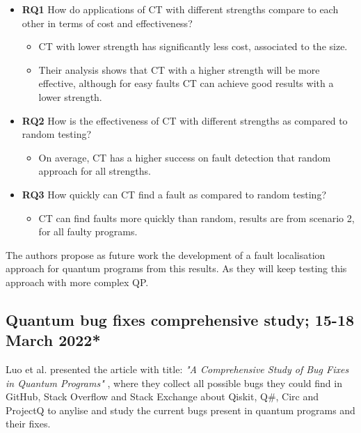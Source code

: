 \begin{itemize}
\begin{itemize}
    \item[] \textbf{RQ1} How do applications of CT with different strengths compare to each other in terms of cost and effectiveness?
        \begin{itemize}
            \item CT with lower strength has significantly less cost, associated to the size.
            \item Their analysis shows that CT with a higher strength will be more effective, although for easy faults CT can achieve good results with a lower strength.
        \end{itemize}
    \item[] \textbf{RQ2} How is the effectiveness of CT with different strengths as compared to random testing?
        \begin{itemize}
            \item On average, CT has a higher success on fault detection that random approach for all strengths.
        \end{itemize}
    \item[] \textbf{RQ3} How quickly can CT find a fault as compared to random testing?
        \begin{itemize}
            \item CT can find faults more quickly than random, results are from scenario 2, for all faulty programs.
        \end{itemize}
\end{itemize}

The authors propose as future work the development of a fault localisation approach for quantum programs from this results. As they will keep testing this approach with more complex QP.

\vspace{15pt}
\subsection{Quantum bug fixes comprehensive study; 15-18 March 2022*}

Luo et al. presented the article with title: \textit{"A Comprehensive Study of Bug Fixes in Quantum Programs"} \cite{luo2022comprehensive}, where they collect all possible bugs they could find in GitHub, Stack Overflow and Stack Exchange about Qiskit, Q\#, Circ and ProjectQ to anylise and study the current bugs present in quantum programs and their fixes.\newline


\end{itemize}
